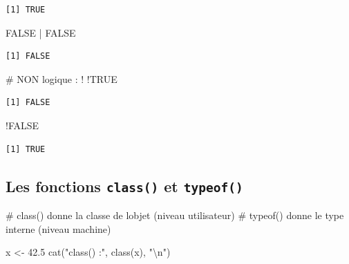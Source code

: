 \documentclass[
  french,
  11pt,
  a4paper,
]{article}
\newenvironment{Shaded}{}{}
\newcommand{\CommentTok}[1]{\textcolor[rgb]{0.42,0.45,0.49}{#1}}
\newcommand{\ConstantTok}[1]{\textcolor[rgb]{0.00,0.36,0.77}{#1}}
\newcommand{\FloatTok}[1]{\textcolor[rgb]{0.00,0.36,0.77}{#1}}
\newcommand{\FunctionTok}[1]{\textcolor[rgb]{0.44,0.26,0.76}{#1}}
\newcommand{\NormalTok}[1]{\textcolor[rgb]{0.14,0.16,0.18}{#1}}
\newcommand{\OtherTok}[1]{\textcolor[rgb]{0.44,0.26,0.76}{#1}}
\newcommand{\SpecialCharTok}[1]{\textcolor[rgb]{0.00,0.36,0.77}{#1}}
\newcommand{\StringTok}[1]{\textcolor[rgb]{0.01,0.18,0.38}{#1}}
\begin{document}
\begin{verbatim}
[1] TRUE
\end{verbatim}

\begin{Shaded}
\begin{Highlighting}[]
\ConstantTok{FALSE} \SpecialCharTok{|} \ConstantTok{FALSE}
\end{Highlighting}
\end{Shaded}

\begin{verbatim}
[1] FALSE
\end{verbatim}

\begin{Shaded}
\begin{Highlighting}[]
\CommentTok{\# NON logique : !}
\SpecialCharTok{!}\ConstantTok{TRUE}
\end{Highlighting}
\end{Shaded}

\begin{verbatim}
[1] FALSE
\end{verbatim}

\begin{Shaded}
\begin{Highlighting}[]
\SpecialCharTok{!}\ConstantTok{FALSE}
\end{Highlighting}
\end{Shaded}

\begin{verbatim}
[1] TRUE
\end{verbatim}

\subsection{\texorpdfstring{Les fonctions \texttt{class()} et
\texttt{typeof()}}{Les fonctions class() et typeof()}}\label{les-fonctions-class-et-typeof}

\begin{Shaded}
\begin{Highlighting}[]
\CommentTok{\# class() donne la classe de l\textquotesingle{}objet (niveau utilisateur)}
\CommentTok{\# typeof() donne le type interne (niveau machine)}

\NormalTok{x }\OtherTok{\textless{}{-}} \FloatTok{42.5}
\FunctionTok{cat}\NormalTok{(}\StringTok{"class() :"}\NormalTok{, }\FunctionTok{class}\NormalTok{(x), }\StringTok{"}\SpecialCharTok{\textbackslash{}n}\StringTok{"}\NormalTok{)}
\end{Highlighting}
\end{Shaded}
\end{document}
